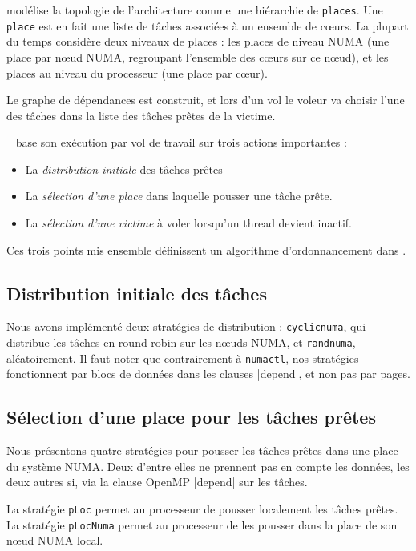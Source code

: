 \documentclass[parallelisme]{compas2016}
\begin{document}
\kaapi modélise la topologie de l'architecture comme une hiérarchie de \verb/places/.
Une \verb/place/ est en fait une liste de tâches associées à un ensemble de cœurs.
La plupart du temps \kaapi considère deux niveaux de places : les places de niveau
NUMA (une place par nœud NUMA, regroupant l'ensemble des cœurs sur ce nœud),
et les places au niveau du processeur (une place par cœur).


Le graphe de dépendances est construit, et lors d'un vol le voleur va choisir
l'une des tâches dans la liste des tâches prêtes de la victime.

\kaapi~\cite{DBLP:journals/corr/BleuseGLMT14} base son exécution par vol de travail
sur trois actions importantes :
\begin{itemize}
  \item La \textit{distribution initiale} des tâches prêtes
  \item La \textit{sélection d'une place} dans laquelle pousser une tâche prête.
  \item La \textit{sélection d'une victime} à voler lorsqu'un thread devient inactif.
\end{itemize}

Ces trois points mis ensemble définissent un algorithme d'ordonnancement dans \kaapi.



\subsection{Distribution initiale des tâches}

Nous avons implémenté deux stratégies de distribution : \verb/cyclicnuma/, qui
distribue les tâches en round-robin sur les nœuds NUMA, et \verb/randnuma/, aléatoirement.
Il faut noter que contrairement à \verb/numactl/, nos stratégies fonctionnent
par blocs de données dans les clauses |depend|, et non pas par pages.


\subsection{Sélection d'une place pour les tâches prêtes}

Nous présentons quatre stratégies pour pousser les tâches prêtes dans une place
du système NUMA. Deux d'entre elles ne prennent pas en compte les données, les deux
autres si, via la clause OpenMP |depend| sur les tâches.

La stratégie \verb/pLoc/ permet au processeur de pousser localement les tâches prêtes.
La stratégie \verb/pLocNuma/ permet au processeur de les pousser dans la place de son nœud NUMA local.
\end{document}

